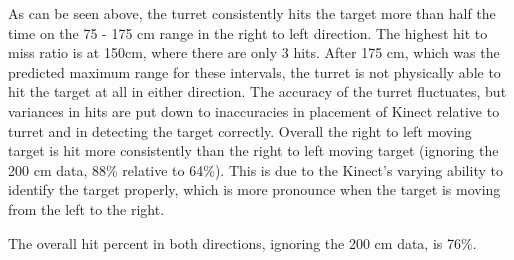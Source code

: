 As can be seen above, the turret consistently hits the target more than half the time on the 75 - 175 cm range in the right to left direction. The highest hit to miss ratio is at 150cm, where there are only 3 hits. After 175 cm, which was the predicted maximum range for these intervals, the turret is not physically able to hit the target at all in either direction. The accuracy of the turret fluctuates, but variances in hits are put down to inaccuracies in placement of Kinect relative to turret and in detecting the target correctly. Overall the right to left moving target is hit more consistently than the right to left moving target (ignoring the 200 cm data, 88\% relative to 64\%). This is due to the Kinect's varying ability to identify the target properly, which is more pronounce when the target is moving from the left to the right.

The overall hit percent in both directions, ignoring the 200 cm data, is 76\%.
